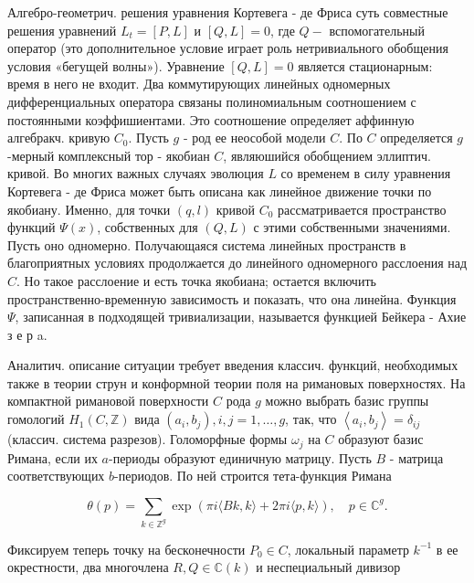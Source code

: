 \documentclass[10pt]{article}
\begin{document}
Алгебро-геометрич. решения уравнения Кортевега - де Фриса суть совместные решения уравнений $L_{t}=[P, L]$ и $[Q, L]=0$, где $Q-$ вспомогательный оператор (это дополнительное условие играет роль нетривиального обобщения условия «бегущей волны»). Уравнение $[Q, L]=0$ является стационарным: время в него не входит. Два коммутирующих линейных одномерных дифференциальных оператора связаны полиномиальным соотношением с постоянными коэффишиентами. Это соотношение определяет аффинную алгебракч. кривую $C_{0}$. Пусть $g$ - род ее неособой модели $C$. По $C$ определяется $g$-мерный комплексный тор - якобиан $C$, являюшийся обобщением эллиптич. кривой. Во многих важных случаях эволюция $L$ со временем в силу уравнения Кортевега - де Фриса может быть описана как линейное движение точки по якобиану. Именно, для точки $(q, l)$ кривой $C_{0}$ рассматривается пространство функций $\Psi(x)$, собственных для $(Q, L)$ с этими собственными значениями. Пусть оно одномерно. Получающаяся система линейных пространств в благоприятных условиях продолжается до линейного одномерного расслоения над $C$. Но такое расслоение и есть точка якобиана; остается включить пространственно-временную зависимость и показать, что она линейна. Функция $\Psi$, записанная в подходящей тривиализации, называется функцией Бейкера - Ахие з е р a.



Аналитич. описание ситуации требует введения классич. функций, необходимых также в теории струн и конформной теории поля на римановых поверхностях. На компактной римановой поверхности $C$ рода $g$ можно выбрать базис группы гомологий $H_{1}(C, \mathbb{Z})$ вида $\left(a_{i}, b_{j}\right), i, j=1, \ldots, g$, так, что $\left\langle a_{i}, b_{j}\right\rangle=\delta_{i j}$ (классич. система разрезов). Голоморфные формы $\omega_{j}$ на $C$ образуют базис Римана, если их $a$-периоды образуют единичную матрицу. Пусть $B$ - матрица соответствующих $b$-периодов. По ней строится тета-функция Римана



\[

\theta(p)=\sum_{k \in \mathbb{Z}^{g}} \exp (\pi i\langle B k, k\rangle+2 \pi i\langle p, k\rangle), \quad p \in \mathbb{C}^{g} .

\]



Фиксируем теперь точку на бесконечности $P_{0} \in C$, локальный параметр $k^{-1}$ в ее окрестности, два многочлена $R, Q \in \mathbb{C}(k)$ и неспециальный дивизор
\end{document}

